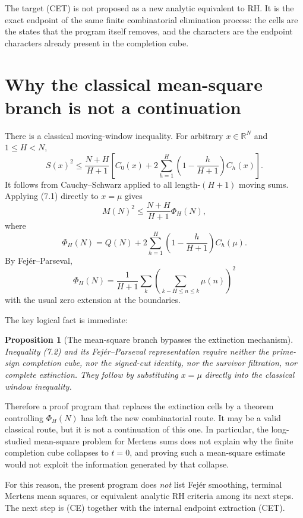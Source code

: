 \documentclass[11pt]{article}
\newtheorem{proposition}[theorem]{Proposition}
\theoremstyle{definition}
\theoremstyle{remark}
\begin{document}
The target (CET) is not proposed as a new analytic equivalent to RH.  It is the exact endpoint of the same finite combinatorial elimination process: the cells are the states that the program itself removes, and the characters are the endpoint characters already present in the completion cube.

\section{Why the classical mean-square branch is not a continuation}\label{sec:nonroute}

There is a classical moving-window inequality.  For arbitrary $x\in\mathbb R^N$ and $1\le H<N$,
\[
 S(x)^2\le
 \frac{N+H}{H+1}
 \left[
 C_0(x)+2\sum_{h=1}^{H}
 \left(1-\frac{h}{H+1}\right)C_h(x)
 \right].
 \tag{7.1}
\]
It follows from Cauchy--Schwarz applied to all length-$(H+1)$ moving sums.  Applying (7.1) directly to $x=\mu$ gives
\[
 M(N)^2\le
 \frac{N+H}{H+1}\Phi_H(N),
 \tag{7.2}
\]
where
\[
 \Phi_H(N)
 =Q(N)+2\sum_{h=1}^{H}
 \left(1-\frac{h}{H+1}\right)C_h(\mu).
\]
By Fej\'er--Parseval,
\[
 \Phi_H(N)
 =\frac1{H+1}\sum_k
 \left(\sum_{k-H\le n\le k}\mu(n)\right)^2
\]
with the usual zero extension at the boundaries.

The key logical fact is immediate:

\begin{proposition}[The mean-square branch bypasses the extinction mechanism]
Inequality (7.2) and its Fej\'er--Parseval representation require neither the prime-sign completion cube, nor the signed-cut identity, nor the survivor filtration, nor complete extinction.  They follow by substituting $x=\mu$ directly into the classical window inequality.
\end{proposition}

Therefore a proof program that replaces the extinction cells by a theorem controlling $\Phi_H(N)$ has left the new combinatorial route.  It may be a valid classical route, but it is not a continuation of this one.  In particular, the long-studied mean-square problem for Mertens sums does not explain why the finite completion cube collapses to $t=0$, and proving such a mean-square estimate would not exploit the information generated by that collapse.

For this reason, the present program does \emph{not} list Fej\'er smoothing, terminal Mertens mean squares, or equivalent analytic RH criteria among its next steps.  The next step is (CE) together with the internal endpoint extraction (CET).
\end{document}
